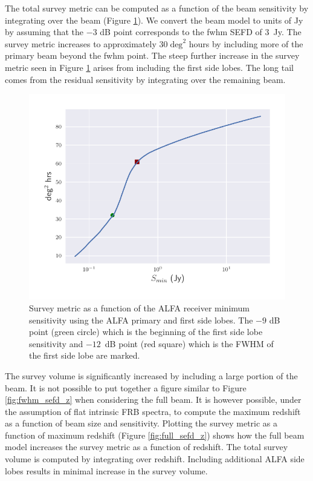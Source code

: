 \documentclass[a4paper,fleqn,usenatbib]{mnras}
\begin{document}
The total survey metric can be computed as a function of the beam
sensitivity by integrating over the beam (Figure
\ref{fig:survey_metric_sense}). We convert the beam model to units of
Jy by assuming that the $-3$ dB point corresponds to the \gls{fwhm}
SEFD of 3~Jy. The survey metric increases to approximately $30 \;
\textrm{deg}^2$ hours by including more of the primary beam beyond the
\gls{fwhm} point. The steep further increase in the survey metric seen
in Figure \ref{fig:survey_metric_sense} arises from including the
first side lobes. The long tail comes from the residual sensitivity by
integrating over the remaining beam.

\begin{figure}
    \includegraphics[width=1.0\linewidth]{figures/full_survey_metric_sense.pdf}
    \caption{Survey metric as a function of the ALFA receiver minimum
    sensitivity using the ALFA primary and first side lobes. The $-9$ dB point
    (green circle) which is the beginning of the first side lobe sensitivity and
    $-12$~dB point (red square) which is the FWHM of the first side lobe are
    marked.
    }
    \label{fig:survey_metric_sense}
\end{figure}

The survey volume is significantly increased by including a large
portion of the beam. It is not possible to put together a figure
similar to Figure \ref{fig:fwhm_sefd_z} when considering the full
beam. It is however possible, under the assumption of flat intrinsic
FRB spectra, to compute the maximum redshift as a function of beam
size and sensitivity. Plotting the survey metric as a function of
maximum redshift (Figure \ref{fig:full_sefd_z}) shows how the full
beam model increases the survey metric as a function of redshift. The
total survey volume is computed by integrating over redshift.
Including additional ALFA side lobes results in minimal increase in
the survey volume.
\end{document}
